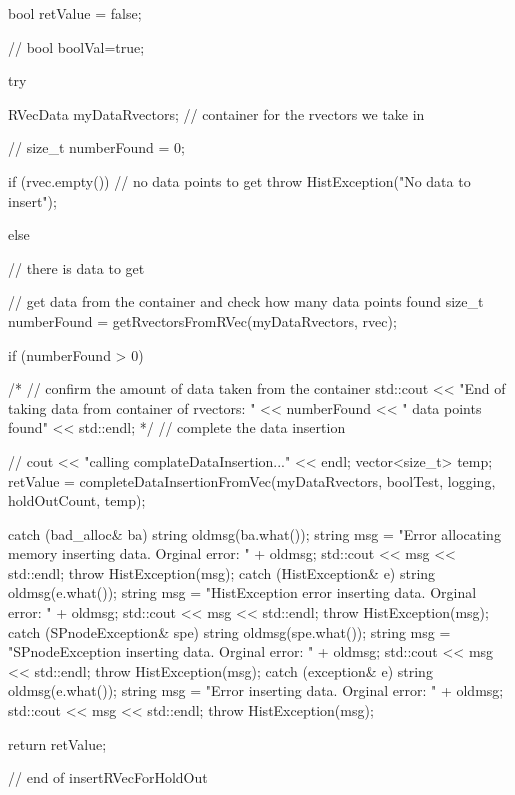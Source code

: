 \begin{DoxyCode}
{
    bool retValue = false;

  //  bool boolVal=true;
    
    try {

        RVecData myDataRvectors; // container for the rvectors we take in

//        size_t numberFound = 0;

        if (rvec.empty()) { // no data points to get
            throw HistException("No data to insert");
        }

        else { // there is data to get

            // get data from the container and check how many data points found
            size_t numberFound = getRvectorsFromRVec(myDataRvectors, rvec);


            if (numberFound > 0) {
                /*
                // confirm the amount of data taken from the container
                std::cout << "End of taking data from container of rvectors: "
                    << numberFound << " data points found" << std::endl;
                */
                // complete the data insertion

               // cout << "calling complateDataInsertion..." << endl;
          vector<size_t> temp;
                retValue = completeDataInsertionFromVec(myDataRvectors,
                                     boolTest, logging, holdOutCount, temp);
            }
        }
    }
    catch (bad_alloc& ba) {
         string oldmsg(ba.what());
        string msg = "Error allocating memory inserting data.  Orginal error: "
                                            + oldmsg;
        std::cout << msg << std::endl;
        throw HistException(msg);
    }
    catch (HistException& e) {
        string oldmsg(e.what());
        string msg = "HistException error inserting data.  Orginal error: "
                                    + oldmsg;
        std::cout << msg << std::endl;
        throw HistException(msg);
    }
    catch (SPnodeException& spe) {
        string oldmsg(spe.what());
        string msg = "SPnodeException inserting data.  Orginal error: " + 
      oldmsg;
        std::cout << msg << std::endl;
        throw HistException(msg);
    }
    catch (exception& e) {
        string oldmsg(e.what());
        string msg = "Error inserting data.  Orginal error: " + oldmsg;
        std::cout << msg << std::endl;
        throw HistException(msg);
    }

    return retValue;
} // end of insertRVecForHoldOut 
\end{DoxyCode}
